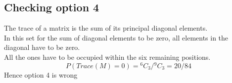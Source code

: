 \documentclass{article}
\begin{document}
\subsection{Checking option 4}
The trace of a matrix is the sum of its principal diagonal elements.\\
In this set for the sum of diagonal elements to be zero, all elements in the diagonal have to be zero.\\
All the ones have to be occupied within the six remaining positions.\\
\[P(Trace(M)=0) = {}^{6}C_{3}/{}^{9}C_{3} = 20/84 \]
Hence option 4 is wrong
\end{document}
